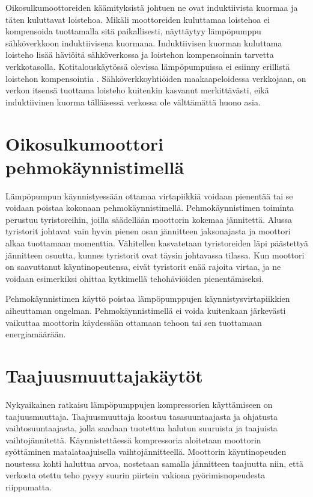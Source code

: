   Oikosulkumoottoreiden käämityksistä johtuen ne ovat induktiivista kuormaa ja täten kuluttavat loistehoa. Mikäli moottoreiden kuluttamaa loistehoa ei kompensoida tuottamalla sitä paikallisesti, näyttäytyy lämpöpumppu sähköverkkoon induktiivisena kuormana. Induktiivisen kuorman kuluttama loisteho lisää häviöitä sähköverkossa ja loistehon kompensoinnin tarvetta verkkotasolla. \parencite{pakonen} Kotitalouskäytössä olevissa lämpöpumpuissa ei esiinny erillistä loistehon kompensointia \parencite{Manner}. Sähköverkkoyhtiöiden maakaapeloidessa verkkojaan, on verkon itsensä tuottama loisteho kuitenkin kasvanut merkittävästi, eikä induktiivinen kuorma tälläisessä verkossa ole välttämättä huono asia.


\section{Oikosulkumoottori pehmokäynnistimellä}
  Lämpöpumpun käynnistyessään ottamaa virtapiikkiä voidaan pienentää tai se voidaan poistaa kokonaan pehmokäynnistimellä. Pehmokäynnistimen toiminta perustuu tyristoreihin, joilla säädellään moottorin kokemaa jännitettä. Alussa tyristorit johtavat vain hyvin pienen osan jännitteen jaksonajasta ja moottori alkaa tuottamaan momenttia. Vähitellen kasvatetaan tyristoreiden läpi päästettyä jännitteen osuutta, kunnes tyristorit ovat täysin johtavassa tilassa. Kun moottori on saavuttanut käyntinopeutensa, eivät tyristorit enää rajoita virtaa, ja ne voidaan esimerkiksi ohittaa kytkimellä tehohäviöiden pienentämiseksi. \parencite{pehmokaynnistinopas}

  Pehmokäynnistimen käyttö poistaa lämpöpumppujen käynnistysvirtapiikkien aiheuttaman ongelman. Pehmokäynnistimellä ei voida kuitenkaan järkevästi vaikuttaa moottorin käydessään ottamaan tehoon tai sen tuottamaan energiamäärään.

\section{Taajuusmuuttajakäytöt}
  Nykyaikainen ratkaisu lämpöpumppujen kompressorien käyttämiseen on taajuusmuuttaja. Taajuusmuuttaja koostuu tasasuuntaajasta ja ohjatusta vaihtosuuntaajasta, jolla saadaan tuotettua halutun suuruista ja taajuista vaihtojännitettä. Käynnistettäessä kompressoria aloitetaan moottorin syöttäminen matalataajuisella vaihtojännitteellä. Moottorin käyntinopeuden noustessa kohti haluttua arvoa, nostetaan samalla jännitteen taajuutta niin, että verkosta otettu teho pysyy suurin piirtein vakiona pyörimisnopeudesta riippumatta.

